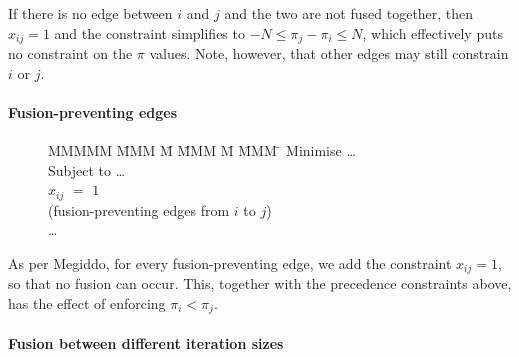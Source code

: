 If there is no edge between $i$ and $j$ and the two are not fused together, then $x_{ij} = 1$ and the constraint simplifies to $-N \le \pi_j - \pi_i \le N$, which effectively puts no constraint on the $\pi$ values.
Note, however, that other edges may still constrain $i$ or $j$.


\paragraph{Fusion-preventing edges}
\begin{figure}[H]
\begin{tabbing}
MMMMM   \= MMM \= M \= MMM \= M \= MMM \= \kill
Minimise   \> \ldots \\
Subject to \> \ldots \\
           \> $x_{ij}$    \> $=$   \> $1$             \>       \>            \\
           \> (fusion-preventing edges from $i$ to $j$)      \\
           \> \ldots
\end{tabbing}
\end{figure}
As per Megiddo\cite{megiddo1998optimal}, for every fusion-preventing edge, we add the constraint $x_{ij} = 1$, so that no fusion can occur. This, together with the precedence constraints above, has the effect of enforcing $\pi_i < \pi_j$.


\paragraph{Fusion between different iteration sizes}

